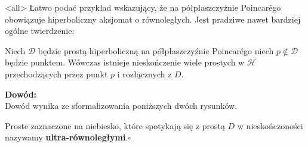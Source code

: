 \mode<all>{}
Łatwo podać przykład wskazujący, że na półpłaszczyźnie Poincar\'{e}go obowiązuje hiperboliczny aksjomat o równoległych. Jest pradziwe nawet bardziej ogólne twierdzenie:

\begin{frame}
 
\begin{twierdzenie} %
Niech $\mathcal D$ będzie prostą hiperboliczną na półpłaszczyźnie Poincar\'{e}go niech $p\notin \mathcal{D}$ będzie punktem. Wówczas istnieje nieskończenie wiele prostych w $\mathcal{H}$ przechodzących przez punkt $p$ i rozłącznych z $D$.
\end{twierdzenie}

\pause \textcolor{ared}{\textbf{Dowód:}}\\
Dowód wynika ze sformalizowania poniższych dwóch rysunków.
\begin{center}

\end{center}
\pause \footnotesize{Proste zaznaczone na niebiesko, które spotykają się z prostą $D$ w nieskończoności nazywamy \textbf{ultra-równoległymi}.}\hfill $\square$

\end{frame}

